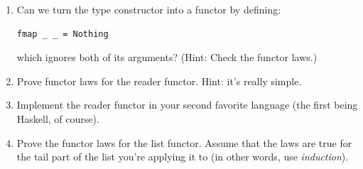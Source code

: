 \begin{enumerate}
\tightlist
\item
  Can we turn the  type constructor into a functor by
  defining:

\begin{Verbatim}
fmap _ _ = Nothing
\end{Verbatim}

  which ignores both of its arguments? (Hint: Check the functor laws.)
\item
  Prove functor laws for the reader functor. Hint: it's really simple.
\item
  Implement the reader functor in your second favorite language (the
  first being Haskell, of course).
\item
  Prove the functor laws for the list functor. Assume that the laws are
  true for the tail part of the list you're applying it to (in other
  words, use \emph{induction}).
\end{enumerate}
